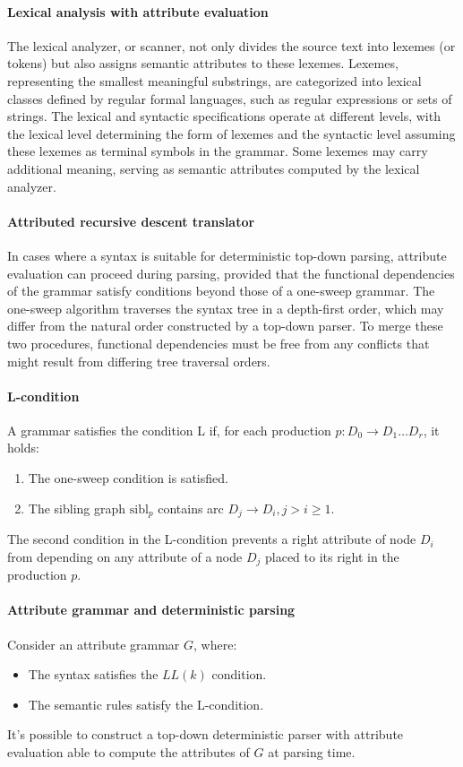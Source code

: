 \paragraph*{Lexical analysis with attribute evaluation}
The lexical analyzer, or scanner, not only divides the source text into lexemes (or tokens) but also assigns semantic attributes to these lexemes. 
Lexemes, representing the smallest meaningful substrings, are categorized into lexical classes defined by regular formal languages, such as regular expressions or sets of strings. 
The lexical and syntactic specifications operate at different levels, with the lexical level determining the form of lexemes and the syntactic level assuming these lexemes as terminal symbols in the grammar.
Some lexemes may carry additional meaning, serving as semantic attributes computed by the lexical analyzer.

\paragraph*{Attributed recursive descent translator}
In cases where a syntax is suitable for deterministic top-down parsing, attribute evaluation can proceed during parsing, provided that the functional dependencies of the grammar satisfy conditions beyond those of a one-sweep grammar. 
The one-sweep algorithm traverses the syntax tree in a depth-first order, which may differ from the natural order constructed by a top-down parser. 
To merge these two procedures, functional dependencies must be free from any conflicts that might result from differing tree traversal orders.

\paragraph*{L-condition}
A grammar satisfies the condition L if, for each production $p: D_0 \rightarrow D_1 \ldots D_r$, it holds:
\begin{enumerate}
    \item The one-sweep condition is satisfied. 
    \item The sibling graph $\text{sibl}_p$ contains arc $D_j \rightarrow D_i, j > i \geq 1$.
\end{enumerate}
The second condition in the L-condition prevents a right attribute of node $D_i$ from depending on any attribute of a node $D_j$ placed to its right in the production $p$.

\paragraph*{Attribute grammar and deterministic parsing}
Consider an attribute grammar $G$, where:
\begin{itemize}
    \item The syntax satisfies the $LL(k)$ condition.
    \item The semantic rules satisfy the L-condition.
\end{itemize}
It's possible to construct a top-down deterministic parser with attribute evaluation able to compute the attributes of $G$ at parsing time.